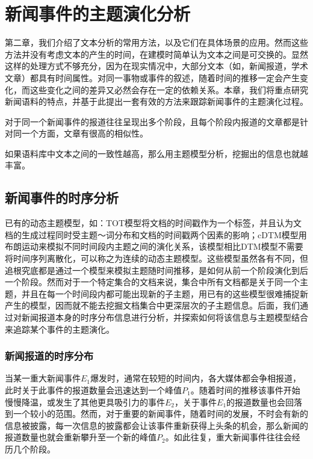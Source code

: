 \chapter{新闻事件的主题演化分析}
第二章，我们介绍了文本分析的常用方法，以及它们在具体场景的应用。然而这些方法并没有考虑文本的产生的时间，在建模时简单认为文本之间是可交换的。显然这样的处理方式不够充分，因为在现实情况中，大部分文本（如，新闻报道，学术文章）都具有时间属性。对同一事物或事件的叙述，随着时间的推移一定会产生变化，而这些变化之间的差异又必然会存在一定的依赖关系。本章，我们将重点研究新闻语料的特点，并基于此提出一套有效的方法来跟踪新闻事件的主题演化过程。

\begin{assumption}
\label{hyp:newsdistribution}
对于同一个新闻事件的报道往往呈现出多个阶段，且每个阶段内报道的文章都是针对同一个方面，文章有很高的相似性。
\end{assumption}

\begin{assumption}
\label{hyp:coherence}
如果语料库中文本之间的一致性越高，那么用主题模型分析，挖掘出的信息也就越丰富。
\end{assumption}

\section{新闻事件的时序分析}
已有的动态主题模型，如：TOT模型\cite{wang2006topics}将文档的时间戳作为一个标签，并且认为文档的生成过程同时受主题～词分布和文档的时间戳两个因素的影响；cDTM模型\cite{wang2008continuous}用布朗运动来模拟不同时间段内主题之间的演化关系，该模型相比DTM模型\cite{Blei:2006}不需要将时间序列离散化，可以称之为连续的动态主题模型。这些模型虽然各有不同，但追根究底都是通过一个模型来模拟主题随时间推移，是如何从前一个阶段演化到后一个阶段。然而对于一个特定集合的文档来说，集合中所有文档都是关于同一个主题，并且在每一个时间段内都可能出现新的子主题，用已有的这些模型很难捕捉新产生的模型，因而就不能去挖掘文档集合中更深层次的子主题信息。后面，我们通过对新闻报道本身的时序分布信息进行分析，并探索如何将该信息与主题模型结合来追踪某个事件的主题演化。
\subsection{新闻报道的时序分布}
当某一重大新闻事件$E_1$爆发时，通常在较短的时间内，各大媒体都会争相报道，此时关于此事件的报道数量会迅速达到一个峰值$P_1$。随着时间的推移该事件开始慢慢降温，或发生了其他更具吸引力的事件$E_2$，关于事件$E_1$的报道数量也会回落到一个较小的范围。然而，对于重要的新闻事件，随着时间的发展，不时会有新的信息被披露，每一次信息的披露都会让该事件重新获得上头条的机会，那么新闻的报道数量也就会重新攀升至一个新的峰值$P_2$。如此往复，重大新闻事件往往会经历几个阶段。

